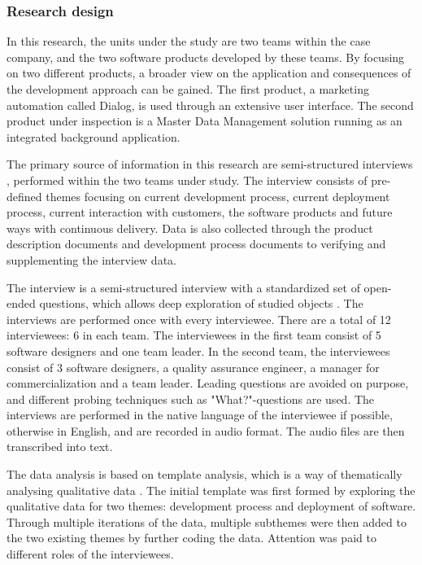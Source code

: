 \documentclass[lnbip]{svmultln}
\begin{document}
\subsubsection{Research design}
In this research, the units under the study are two teams within the case company, and the two software products developed by these teams. By focusing on two different products, a broader view on the application and consequences of the development approach can be gained. The first product, a marketing automation called Dialog, is used through an extensive user interface. The second product under inspection is a Master Data Management \cite{loshin2010master} solution running as an integrated background application. 

The primary source of information in this research are semi-structured interviews \cite{runeson2009guidelines}, performed within the two teams under study. The interview consists of pre-defined themes focusing on current development process, current deployment process, current interaction with customers, the software products and future ways with continuous delivery. Data is also collected through the product description documents and development process documents to verifying and supplementing the interview data. 

The interview is a semi-structured interview with a standardized set of open-ended questions, which allows deep exploration of studied objects \cite{runeson2009guidelines}. The interviews are performed once with every interviewee. There are a total of 12 interviewees: 6 in each team. The interviewees in the first team consist of 5 software designers and one team leader. In the second team, the interviewees consist of 3 software designers, a quality assurance engineer, a manager for commercialization and a team leader. Leading questions are avoided on purpose, and different probing techniques such as "What?"-questions are used. The interviews are performed in the native language of the interviewee if possible, otherwise in English, and are recorded in audio format. The audio files are then transcribed into text.

The data analysis is based on template analysis, which is a way of thematically analysing qualitative data \cite{king1998template}. The initial template was first formed by exploring the qualitative data for two themes: development process and deployment of software. Through multiple iterations of the data, multiple subthemes were then added to the two existing themes by further coding the data. Attention was paid to different roles of the interviewees.
\end{document}

